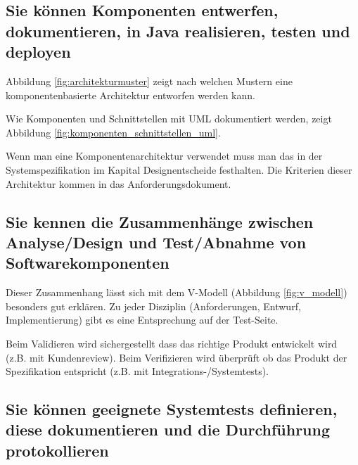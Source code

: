 
\newpage

\subsection{Sie können Komponenten entwerfen, dokumentieren, in Java realisieren, testen und deployen}

Abbildung \ref{fig:architekturmuster} zeigt nach welchen Mustern eine komponentenbasierte Architektur entworfen werden kann.


Wie Komponenten und Schnittstellen mit UML dokumentiert werden, zeigt Abbildung \ref{fig:komponenten_schnittstellen_uml}.


Wenn man eine Komponentenarchitektur verwendet muss man das in der Systemspezifikation im Kapital Designentscheide festhalten. Die Kriterien dieser Architektur kommen in das Anforderungsdokument.

\subsection{Sie kennen die Zusammenhänge zwischen Analyse/Design und Test/Abnahme von Softwarekomponenten}

Dieser Zusammenhang lässt sich mit dem V-Modell (Abbildung \ref{fig:v_modell}) besonders gut erklären. Zu jeder Disziplin (Anforderungen, Entwurf, Implementierung) gibt es eine Entsprechung auf der Test-Seite. 


Beim Validieren wird sichergestellt dass das richtige Produkt entwickelt wird (z.B. mit Kundenreview). Beim Verifizieren wird überprüft ob das Produkt der Spezifikation entspricht (z.B. mit Integrations-/Systemtests).

\newpage

\subsection{Sie können geeignete Systemtests definieren, diese dokumentieren und die Durchführung protokollieren}

